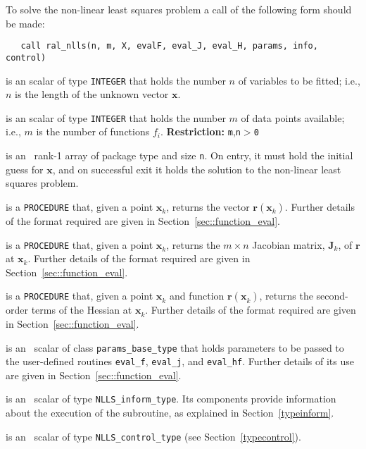 \documentclass{spec}
\newcommand{\scalarintegerii}{is an \intentin scalar of type {\tt INTEGER} }
\newcommand{\vx}{ {\bm x} } %
\newcommand{\vr}{ {\bm r} } %
\newcommand{\vJ}{ {\bm J} } %
\newcommand{\iter}[2][k]{ #2_{#1}^{}} %
\begin{document}
To solve the non-linear least squares problem a call of the following form should be made:

\begin{verbatim}
   call ral_nlls(n, m, X, evalF, eval_J, eval_H, params, info, control)
\end{verbatim}

\begin{description}
 \scalarintegerii that holds the number $n$ of 
variables to be fitted; i.e., $n$ is the length of the unknown vector $\bm x$.

 \scalarintegerii that holds the number $m$ of 
data points available; i.e., $m$ is the number of functions $f_i$.
\textbf{Restriction:} \texttt{m},\texttt{n}$>$\texttt{0}

 is an \intentinout\  rank-1 array of package type 
and size {\tt n}.  On entry, it must hold the initial guess for $\bm x$, and on 
successful exit it holds the solution to the non-linear least squares problem.

 is a {\tt PROCEDURE} that, given a point $\iter{\vx}$, returns the vector $\vr(\iter{\vx})$.  
Further details of the format required are given in Section~\ref{sec::function_eval}.

 is a {\tt PROCEDURE} that, given a point $\iter{\vx}$, 
returns the $m \times n$ Jacobian matrix, $\iter{\vJ}$, of $\vr$ at $\iter{\vx}$.  
Further details of the format required are given in Section~\ref{sec::function_eval}.

 is a {\tt PROCEDURE} that, given a point $\iter{\vx}$
and function $\vr(\iter{\vx})$, returns the second-order terms of the Hessian at $\iter{\vx}$. 
Further details of the format required are given in Section~\ref{sec::function_eval}.

 is an \intentin\ scalar of class {\tt params\_base\_type} that holds parameters to 
be passed to the user-defined routines {\tt eval\_f}, {\tt eval\_j}, and {\tt eval\_hf}. 
Further details of its use are given in Section~\ref{sec::function_eval}.

 is an \intentinout\ scalar of type 
{\tt NLLS\_inform\_type}. Its components provide information about the execution
of the subroutine, as explained in Section~\ref{typeinform}.

is an \intentin\  scalar  of type {\tt NLLS\_control\_type}
(see Section~\ref{typecontrol}).


\end{description}
\end{document}
